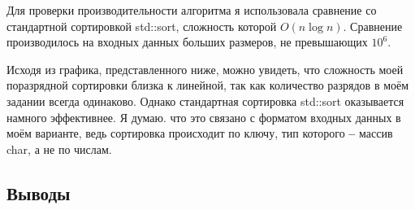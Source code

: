 \documentclass[12pt]{article}
\begin{document}
Для проверки производительности алгоритма я использовала сравнение со стандартной сортировкой std::sort, сложность которой ${O}({n}\log n)$.
Сравнение производилось на входных данных больших размеров, не превышающих ${10^6}$. 

Исходя из графика, представленного ниже, можно увидеть, что сложность моей поразрядной сортировки близка к линейной, так как количество разрядов в моём задании всегда одинаково.
Однако стандартная сортировка std::sort оказывается намного эффективнее. Я думаю. что это связано с форматом входных данных в моём варианте, ведь сортировка происходит по ключу, тип которого \textbf{--} массив char, а не по числам.

\begin{figure}[htbp]
    \centering
    \label{fig:graph}
\end{figure}

\newpage
\subsection*{Выводы}

\end{document}
